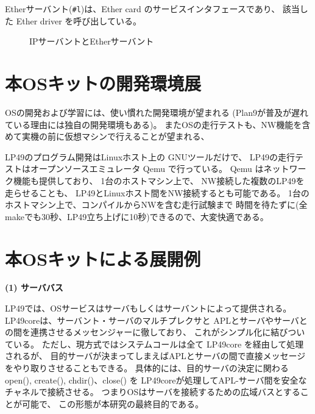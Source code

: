 \documentclass{ipsjpapers}
\begin{document}
Etherサーバント(\verb|#l|)は、Ether card のサービスインタフェースであり、
該当した Ether driver を呼び出している。


\begin{figure}[htb]
  \begin{center}
   \epsfxsize=240pt
    \caption{IPサーバントとEtherサーバント}
    \label{fig:NWservants}
  \end{center}
\end{figure}



\section{本OSキットの開発環境展}

OSの開発および学習には、使い慣れた開発環境が望まれる
(Plan9が普及が遅れている理由には独自の開発環境もある)。
またOSの走行テストも、NW機能を含めて実機の前に仮想マシンで行えることが望まれる、

LP49のプログラム開発はLinuxホスト上の GNUツールだけで、
LP49の走行テストはオープンソースエミュレータ Qemu で行っている。
Qemu はネットワーク機能も提供しており、
1台のホストマシン上で、
NW接続した複数のLP49を走らせることも、
LP49とLinuxホスト間をNW接続するとも可能である。
1台のホストマシン上で、コンパイルからNWを含む走行試験まで
時間を待たずに(全makeでも30秒、LP49立ち上げに10秒)できるので、大変快適である。

\begin{comment}
\begin{figure}[htb]
  \begin{center}
   \epsfxsize=400pt
   \epsfbox{../fig/SDE.eps}
    \caption{開発試験環境}
    \label{fig:SDE}
  \end{center}
\end{figure}
\end{comment}

\section{本OSキットによる展開例}

{\bf\flushleft (1) サーババス}

LP49では、OSサービスはサーバもしくはサーバントによって提供される。
LP49coreは、サーバント・サーバのマルチプレクサと
APLとサーバやサーバとの間を連携させるメッセンジャーに徹しており、
これがシンプル化に結びついている。
ただし、現方式ではシステムコールは全て LP49core を経由して処理されるが、
目的サーバが決まってしまえばAPLとサーバの間で直接メッセージをやり取りさせることもできる。
具体的には、目的サーバの決定に関わるopen(), create(), chdir()、close() を
LP49coreが処理してAPL-サーバ間を安全なチャネルで接続させる。
つまりOSはサーバを接続するための広域バスとすることが可能で、
この形態が本研究の最終目的である。
\end{document}
